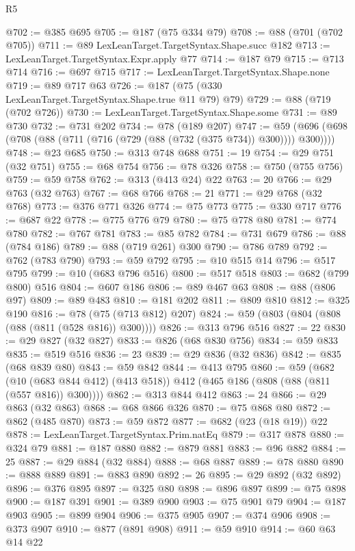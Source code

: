 \begin{lexlean}{R5}
\begin{coremodule}
@702 := @385 @695
@705 := @187 (@75 @334 @79)
@708 := @88 (@701 (@702 @705))
@711 := @89 LexLeanTarget.TargetSyntax.Shape.succ @182
@713 := LexLeanTarget.TargetSyntax.Expr.apply @77
@714 := @187 @79
@715 := @713 @714
@716 := @697 @715
@717 := LexLeanTarget.TargetSyntax.Shape.none
@719 := @89 @717 @63
@726 := @187 (@75 (@330 LexLeanTarget.TargetSyntax.Shape.true @11 @79) @79)
@729 := @88 (@719 (@702 @726))
@730 := LexLeanTarget.TargetSyntax.Shape.some
@731 := @89 @730
@732 := @731 @202
@734 := @78 (@189 @207)
@747 := @59 (@696 (@698 (@708 (@88 (@711 (@716 (@729 (@88 (@732 (@375 @734)) @300)))) @300))))
@748 := @23 @685
@750 := @313 @748 @688
@751 := 19
@754 := @29 @751 (@32 @751)
@755 := @68 @754
@756 := @78 @326
@758 := @750 (@755 @756)
@759 := @59 @758
@762 := @313 (@413 @24) @22
@763 := 20
@766 := @29 @763 (@32 @763)
@767 := @68 @766
@768 := 21
@771 := @29 @768 (@32 @768)
@773 := @376 @771 @326
@774 := @75 @773
@775 := @330 @717
@776 := @687 @22
@778 := @775 @776 @79
@780 := @75 @778 @80
@781 := @774 @780
@782 := @767 @781
@783 := @85 @782
@784 := @731 @679
@786 := @88 (@784 @186)
@789 := @88 (@719 @261) @300
@790 := @786 @789
@792 := @762 (@783 @790)
@793 := @59 @792
@795 := @10 @515 @14
@796 := @517 @795
@799 := @10 (@683 @796 @516)
@800 := @517 @518
@803 := @682 (@799 @800) @516
@804 := @607 @186
@806 := @89 @467 @63
@808 := @88 (@806 @97)
@809 := @89 @483
@810 := @181 @202
@811 := @809 @810
@812 := @325 @190
@816 := @78 (@75 (@713 @812) @207)
@824 := @59 (@803 (@804 (@808 (@88 (@811 (@528 @816)) @300))))
@826 := @313 @796 @516
@827 := 22
@830 := @29 @827 (@32 @827)
@833 := @826 (@68 @830 @756)
@834 := @59 @833
@835 := @519 @516
@836 := 23
@839 := @29 @836 (@32 @836)
@842 := @835 (@68 @839 @80)
@843 := @59 @842
@844 := @413 @795
@860 := @59
    (@682 (@10 (@683 @844 @412) (@413 @518)) @412 (@465 @186 (@808 (@88 (@811 (@557 @816)) @300))))
@862 := @313 @844 @412
@863 := 24
@866 := @29 @863 (@32 @863)
@868 := @68 @866 @326
@870 := @75 @868 @80
@872 := @862 (@485 @870)
@873 := @59 @872
@877 := @682 (@23 (@18 @19)) @22
@878 := LexLeanTarget.TargetSyntax.Prim.natEq
@879 := @317 @878
@880 := @324 @79
@881 := @187 @880
@882 := @879 @881
@883 := @96 @882
@884 := 25
@887 := @29 @884 (@32 @884)
@888 := @68 @887
@889 := @78 @880
@890 := @888 @889
@891 := @883 @890
@892 := 26
@895 := @29 @892 (@32 @892)
@896 := @376 @895
@897 := @325 @80
@898 := @896 @897
@899 := @75 @898
@900 := @187 @391
@901 := @389 @900
@903 := @75 @901 @79
@904 := @187 @903
@905 := @899 @904
@906 := @375 @905
@907 := @374 @906
@908 := @373 @907
@910 := @877 (@891 @908)
@911 := @59 @910
@914 := @60 @63 @14 @22

\end{coremodule}
\end{lexlean}
